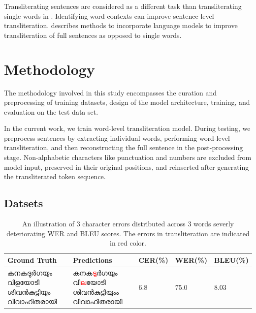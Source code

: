\documentclass[11pt]{article}
\begin{document}
Transliterating sentences are considered as a different task than transliterating single words in \cite{roark-etal-2020-processing}. Identifying word contexts can improve sentence level transliteration. \citeauthor{kirov2024context} describes methods to incorporate language models to improve transliteration of full sentences as opposed to single words. 

\vspace{-.2cm}
\section{Methodology}

The methodology involved in this study encompasses the curation and preprocessing of training datasets, design of the model architecture, training, and evaluation on the test data set. 

In the current work, we train word-level transliteration model. During testing, we preprocess sentences by extracting individual words, performing word-level transliteration, and then reconstructing the full sentence in the post-processing stage. Non-alphabetic characters like punctuation and numbers are excluded from model input, preserved in their original positions, and reinserted after generating the transliterated token sequence.
\vspace{-.2cm}
\subsection{Datsets}

\begin{table}[htbp]
  \caption{An illustration of 3 character errors distributed across 3 words severly deteriorating WER and BLEU scores. The errors in transliteration are indicated in red color.}
  \label{tab:test1}
  \centering
   \begin{tabular}{p{4cm}p{4.3cm}p{1.7cm}p{1.7cm}p{1.7cm}}

    \hline
    \textbf{Ground Truth} & \textbf{Predictions} & \textbf{CER(\%)} & \textbf{WER(\%)} &\textbf{BLEU(\%)}\\
    \hline
    {\footnotesize{\malayalamfont കനകദുർഗയും വിളയോടി ശിവൻകുട്ടിയും വിവാഹിതരായി}}
     & {\footnotesize{\malayalamfont കനക\textcolor{red}{ടു}ർഗയും വി\textcolor{red}{ല}യോടി ശിവൻകുട്ടിയും\textcolor{red}{ം} വിവാഹിതരായി}} & 6.8 & 75.0 & 8.03 \\ 
    \hline
  \end{tabular}

\end{table}
\end{document}
